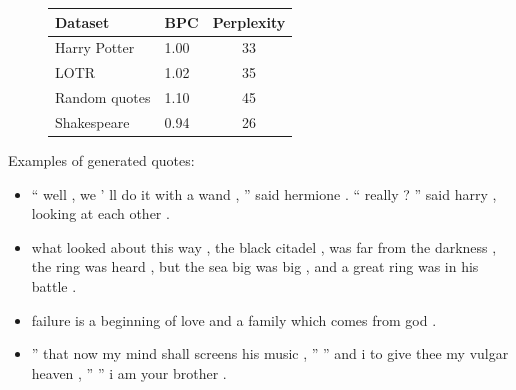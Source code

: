 \begin{figure}[htbp!]
\begin{tabular}{|l|l|c|}
\hline
Dataset & BPC & Perplexity \\
\hline
Harry Potter & 1.00 & 33 \\
LOTR & 1.02 & 35 \\
Random quotes & 1.10 & 45 \\
Shakespeare & 0.94 & 26\\
\hline
\end{tabular}
\end{figure}

Examples of generated quotes:
\begin{itemize}\compresslist
    \item `` well , we ' ll do it with a wand , '' said hermione . `` really ?
      '' said harry , looking at each other .
    \item  what looked about this
      way , the black citadel , was far from the
          darkness , the ring was heard , but the sea big was big , and a great
          ring was in his battle .
    \item failure is a beginning of love and a family which comes from god .
    \item  '' that now my mind shall screens his music , '' '' and i to give
      thee my vulgar heaven , '' '' i am your brother .
\end{itemize}
